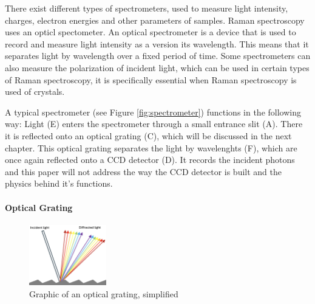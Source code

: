 There exist different types of spectrometers, used to measure light intensity, charges, electron energies and other parameters of samples. Raman spectroscopy uses an opticl spectometer. An optical spectrometer is a device that is used to record and measure light intensity as a version its wavelength. This means that it separates light by wavelength over a fixed period of time. Some spectrometers can also measure the polarization of incident light, which can be used in certain types of Raman spectroscopy, it is specifically essential when Raman spectroscopy is used of crystals. \cite{RSAA} \cite{wikioptspec}

\bigskip

A typical spectrometer (see Figure \ref{fig:spectrometer}) functions in the following way: Light (E) enters the spectrometer through a small entrance slit (A). There it is reflected onto an optical grating (C), which will be discussed in the next chapter. This optical grating separates the light by wavelenghts (F), which are once again reflected onto a CCD detector (D). It records the incident photons and this paper will not address the way the CCD detector is built and the physics behind it's functions.\cite{wikigrating}

\paragraph{Optical Grating}

\begin{figure} %
    \centering
    \includegraphics[width=0.3\textwidth]{images/setup_graphics/optical_grating.png}
    \caption{Graphic of an optical grating, simplified}
    \label{fig:grating}
    \vspace{-20pt}
\end{figure}

